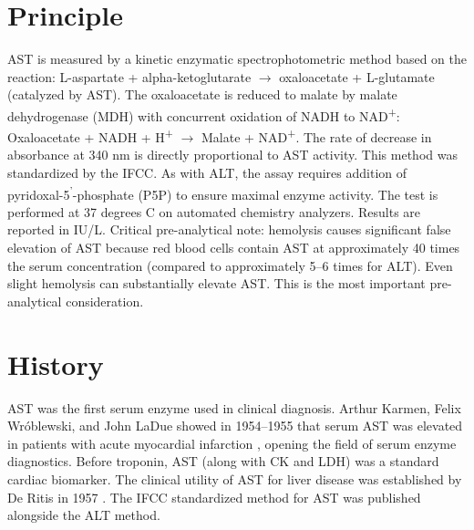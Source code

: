 \section*{Principle}
AST is measured by a kinetic enzymatic spectrophotometric method based on the reaction: L-aspartate + alpha-ketoglutarate $\rightarrow$ oxaloacetate + L-glutamate (catalyzed by AST). The oxaloacetate is reduced to malate by malate dehydrogenase (MDH) with concurrent oxidation of NADH to NAD\textsuperscript{+}: Oxaloacetate + NADH + H\textsuperscript{+} $\rightarrow$ Malate + NAD\textsuperscript{+}. The rate of decrease in absorbance at 340 nm is directly proportional to AST activity. This method was standardized by the IFCC. As with ALT, the assay requires addition of pyridoxal-5\textsuperscript{'}-phosphate (P5P) to ensure maximal enzyme activity. The test is performed at 37 degrees C on automated chemistry analyzers. Results are reported in IU/L. Critical pre-analytical note: hemolysis causes significant false elevation of AST because red blood cells contain AST at approximately 40 times the serum concentration (compared to approximately 5--6 times for ALT). Even slight hemolysis can substantially elevate AST. This is the most important pre-analytical consideration.

\section*{History}
AST was the first serum enzyme used in clinical diagnosis. Arthur Karmen, Felix Wr\'{o}blewski, and John LaDue showed in 1954--1955 that serum AST was elevated in patients with acute myocardial infarction \cite{karmen1955transaminase}, opening the field of serum enzyme diagnostics. Before troponin, AST (along with CK and LDH) was a standard cardiac biomarker. The clinical utility of AST for liver disease was established by De Ritis in 1957 \cite{deritis1957enzymic}. The IFCC standardized method for AST was published alongside the ALT method.

